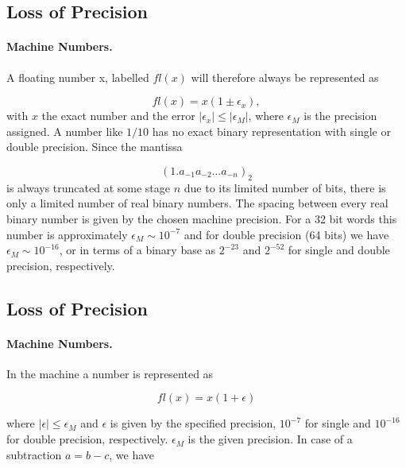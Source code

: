 \documentclass[%
oneside,                 %
final,                   %
10pt]{article}
\begin{document}
\subsection*{Loss of Precision}


\paragraph{Machine Numbers.}
A floating number x, labelled $fl(x)$ will therefore always be represented as

\begin{equation}
  fl(x) = x(1\pm \epsilon_x),
\end{equation}
with $x$ the exact number and the error $|\epsilon_x| \le |\epsilon_M|$, where
$\epsilon_M$ is the precision assigned. A number like $1/10$ has no exact binary representation
with single or double precision. Since the mantissa

\[
\left(1.a_{-1}a_{-2}\dots a_{-n}\right)_2
\]
is always truncated at some stage $n$ due to its limited number of bits, there is only a
limited number of real binary numbers. The spacing between every real binary number is given by the
chosen machine precision.
For a 32 bit words this number is approximately
$ \epsilon_M \sim 10^{-7}$ and for double precision (64 bits) we have
$ \epsilon_M \sim 10^{-16}$, or in terms of a binary base
as $2^{-23}$ and $2^{-52}$ for single and double precision, respectively.



\subsection*{Loss of Precision}


\paragraph{Machine Numbers.}
In the machine a number is represented as

\begin{equation}
  fl(x)= x(1+\epsilon)
\end{equation}

where $|\epsilon| \leq \epsilon_M$ and $\epsilon$ is given by the
specified precision, $10^{-7}$ for single and $10^{-16}$ for double
precision, respectively.
$\epsilon_M$ is the given precision.
In case of a subtraction $a=b-c$, we have
\end{document}
